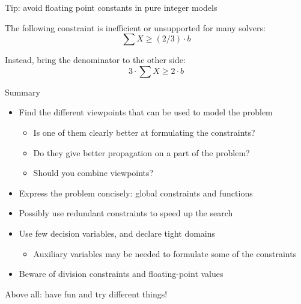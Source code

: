 \documentclass{cons-beamer}
\begin{document}
\begin{frame}{Tip: avoid floating point constants in pure integer models}
\begin{example}[]
  The following constraint is inefficient or unsupported for many solvers:
  \[
    \sum X \geq (2/3) \cdot b
  \]

  Instead, bring the denominator to the other side:
  \[
    3\cdot \sum X \geq 2\cdot b
  \]
\end{example}
\end{frame}

\begin{frame}{Summary}
\begin{itemize}
  \item Find the different viewpoints that can be used to model
    the problem
    \begin{itemize}
      \item Is one of them clearly better at formulating the constraints?
      \item Do they give better propagation on a part of the problem?
      \item Should you combine viewpoints?
    \end{itemize}
  \item Express the problem concisely: global constraints and functions
  \item Possibly use redundant constraints to speed up the search
  \item Use few decision variables, and declare tight domains
    \begin{itemize}
      \item Auxiliary variables may be needed to formulate some of the constraints
    \end{itemize}
  \item Beware of division constraints and floating-point values
\end{itemize}
\vfill

Above all: have fun and try different things!
\end{frame}
\end{document}
